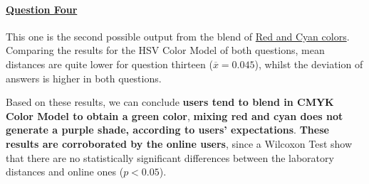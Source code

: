 \paragraph{\ul{Question Four}}
%
This one is the second possible output from the blend of \ul{Red and Cyan colors}. Comparing the results for the HSV Color Model of both questions, mean distances are quite lower for question thirteen
($\overline{x} = 0.045$), whilst the deviation of answers is higher in both questions. \par
%
Based on these results, we can conclude \textbf{users tend to blend in CMYK Color Model to obtain a green color}, \textbf{mixing red and cyan
does not generate a purple shade, according to users' expectations}. \textbf{These results are corroborated by the online users}, since a Wilcoxon
Test show that there are no statistically significant differences between the laboratory distances and online ones ($p < 0.05$).
%
